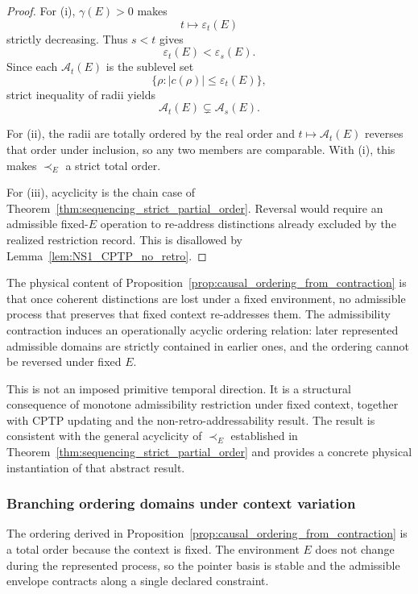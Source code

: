 \documentclass[aps,prx,onecolumn,11pt]{revtex4-2}
\theoremstyle{plain}
\theoremstyle{definition}
\theoremstyle{remark}
\begin{document}
\begin{proof}
For (i), \(\gamma(E)>0\) makes
\[
t\mapsto\varepsilon_t(E)
\]
strictly decreasing. Thus \(s<t\) gives
\[
\varepsilon_t(E)<\varepsilon_s(E).
\]
Since each \(\mathcal A_t(E)\) is the sublevel set
\[
\{\rho:|c(\rho)|\leq\varepsilon_t(E)\},
\]
strict inequality of radii yields
\[
\mathcal A_t(E)\subsetneq\mathcal A_s(E).
\]

For (ii), the radii are totally ordered by the real order and
\(t\mapsto\mathcal A_t(E)\) reverses that order under inclusion, so any
two members are comparable. With (i), this makes \(\prec_E\) a strict
total order.

For (iii), acyclicity is the chain case of
Theorem~\ref{thm:sequencing_strict_partial_order}. Reversal would require
an admissible fixed-\(E\) operation to re-address distinctions already
excluded by the realized restriction record. This is disallowed by
Lemma~\ref{lem:NS1_CPTP_no_retro}.
\end{proof}

The physical content of
Proposition~\ref{prop:causal_ordering_from_contraction} is that once
coherent distinctions are lost under a fixed environment, no admissible
process that preserves that fixed context re-addresses them. The
admissibility contraction induces an operationally acyclic ordering
relation: later represented admissible domains are strictly contained in
earlier ones, and the ordering cannot be reversed under fixed \(E\).

This is not an imposed primitive temporal direction. It is a structural
consequence of monotone admissibility restriction under fixed context,
together with CPTP updating and the non-retro-addressability result. The
result is consistent with the general acyclicity of \(\prec_E\)
established in Theorem~\ref{thm:sequencing_strict_partial_order} and
provides a concrete physical instantiation of that abstract result.

\subsubsection{Branching ordering domains under context variation}
\label{sec:branching-causal-order}

The ordering derived in
Proposition~\ref{prop:causal_ordering_from_contraction} is a total
order because the context is fixed. The environment \(E\) does not
change during the represented process, so the pointer basis is stable
and the admissible envelope contracts along a single declared
constraint.
\end{document}

